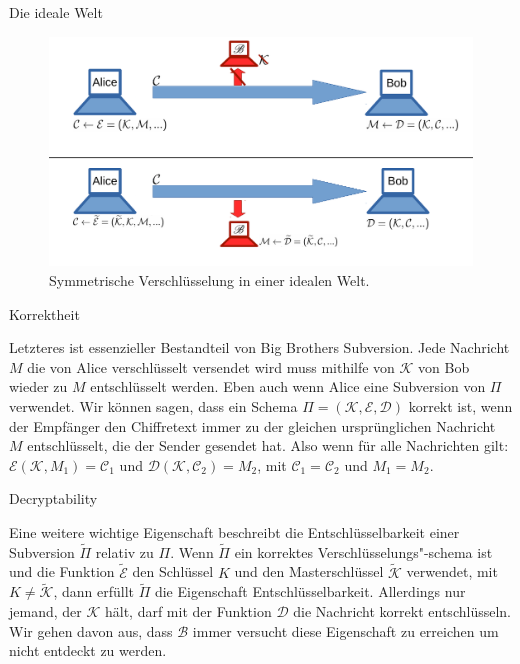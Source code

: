 \begin{section}{Die ideale Welt}
\begin{figure}[!ht]
	\centering
	\includegraphics[width=\textwidth]{image/ideale_welt}
	\caption{Symmetrische Verschlüsselung in einer idealen Welt.}
	\label{fig:ideale_welt}
\end{figure}

\end{section}

\begin{section}{Korrektheit}
\label{sec:korrekt}

Letzteres ist essenzieller Bestandteil von Big Brothers Subversion. Jede Nachricht $M$ die von Alice verschlüsselt versendet wird muss mithilfe von $\mathcal{K}$ von Bob wieder zu $M$ entschlüsselt werden. Eben auch wenn Alice eine Subversion von $\Pi$ verwendet. Wir können sagen, dass ein Schema $\Pi = (\mathcal{K}, \mathcal{E}, \mathcal{D})$ korrekt ist, wenn der Empfänger den Chiffretext immer zu der gleichen ursprünglichen Nachricht $M$ entschlüsselt, die der Sender gesendet hat. Also wenn für alle Nachrichten gilt: $\mathcal{E}(\mathcal{K}, M_{1}) = \mathcal{C}_{1}$ und $\mathcal{D}(\mathcal{K}, \mathcal{C}_{2}) = M_{2}$, mit $\mathcal{C}_{1} = \mathcal{C}_{2}$ und $M_{1} = M_{2}$.

\end{section}

\begin{section}{Decryptability}
\label{sec:decryptability}

Eine weitere wichtige Eigenschaft beschreibt die Entschlüsselbarkeit einer Subversion $\widetilde{\Pi}$ relativ zu $\Pi$. Wenn $\widetilde{\Pi}$ ein korrektes Verschlüsselungs"-schema ist und die Funktion $\widetilde{\mathcal{E}}$ den Schlüssel $K$ und den Masterschlüssel $\widetilde{\mathcal{K}}$ verwendet, mit $K \neq \widetilde{\mathcal{K}}$, dann erfüllt $\widetilde{\Pi}$ die Eigenschaft Entschlüsselbarkeit. Allerdings nur jemand, der $\mathcal{K}$ hält, darf mit der Funktion $\mathcal{D}$ die Nachricht korrekt entschlüsseln. Wir gehen davon aus, dass $\mathscr{B}$ immer versucht diese Eigenschaft zu erreichen um nicht entdeckt zu werden.

\end{section}


